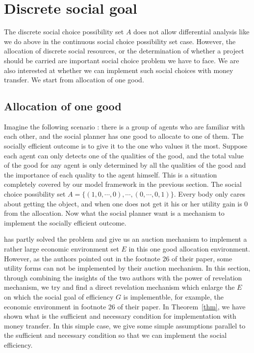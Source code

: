 \section{Discrete social goal}
The discrete social choice possibility set $A$ does not allow differential analysis like we do above in the continuous social choice
possibility set case. However, the allocation of discrete social resources, or the determination of whether a project should be carried
are important social choice problem we have to face. We are also interested at whether we can implement such social choices with money
transfer. We start from allocation of one good.

\subsection{Allocation of one good  }

Imagine the following scenario : there is a group of agents who are familiar with each other, and the social planner has
one good to allocate to one of them. The socially efficient outcome is to give it to the one who 
values it the most. Suppose each agent can only detects one of the qualities of the good, and the total value of the 
good for any agent is only determined by all the qualities of the good and the importance of each quality to the agent 
himself. This is a situation completely covered by our model framework in the previous section. The social choice possibility
set $A=\{(1,0,\cdots,0),\cdots,(0,\cdots,0,1)\}$. Every body only cares about getting the object, and when one does not get it his or
her utility gain is 0 from the allocation. Now what the social planner want is a mechanism to implement the socially efficient outcome. 

\parencite{Maskin00} has partly solved the problem and give us an auction mechanism to implement a rather large economic 
environment set $E$ in this one good allocation environment. However, as the authors pointed out in the footnote 26 of 
their paper, some utility forms can not be implemented by their auction mechanism. In this section, through combining the 
insights of the two authors with the power of revelation mechanism, we try and find a direct revelation mechanism  which
enlarge the $E$ on which the social goal of efficiency $G$ is implementble, for example, the economic environment in footnote
26 of their paper.
In Theorem~\ref{thm}, we have shown what is the sufficient and necessary condition for implementation with money 
transfer. In this simple case, we give some simple assumptions parallel to the sufficient and necessary condition
so that we can implement the social efficiency.

